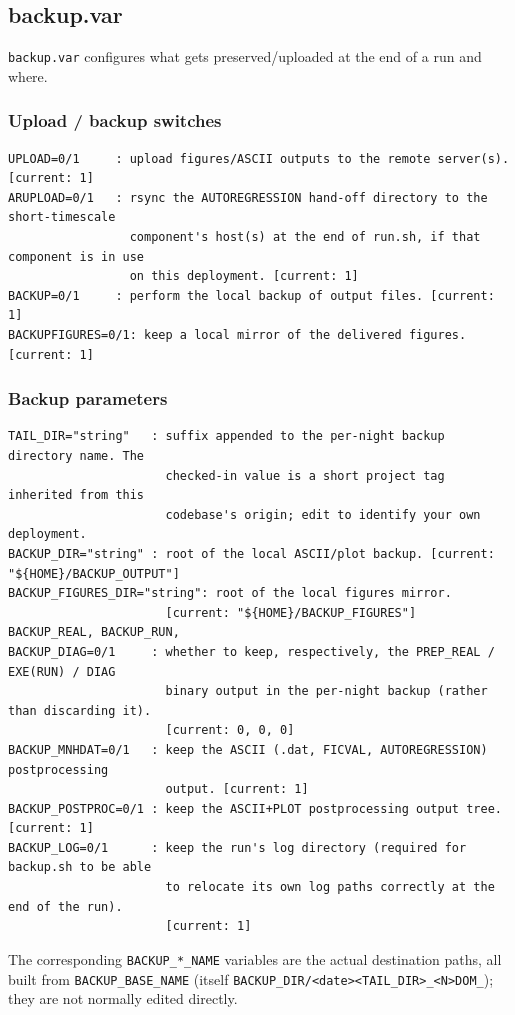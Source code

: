 \subsection{backup.var}
\texttt{backup.var} configures what gets preserved/uploaded at the end of a run and where.

\subsubsection{Upload / backup switches}
\begin{lstlisting}
UPLOAD=0/1     : upload figures/ASCII outputs to the remote server(s). [current: 1]
ARUPLOAD=0/1   : rsync the AUTOREGRESSION hand-off directory to the short-timescale
                 component's host(s) at the end of run.sh, if that component is in use
                 on this deployment. [current: 1]
BACKUP=0/1     : perform the local backup of output files. [current: 1]
BACKUPFIGURES=0/1: keep a local mirror of the delivered figures. [current: 1]
\end{lstlisting}

\subsubsection{Backup parameters}
\begin{lstlisting}
TAIL_DIR="string"   : suffix appended to the per-night backup directory name. The
                      checked-in value is a short project tag inherited from this
                      codebase's origin; edit to identify your own deployment.
BACKUP_DIR="string" : root of the local ASCII/plot backup. [current: "${HOME}/BACKUP_OUTPUT"]
BACKUP_FIGURES_DIR="string": root of the local figures mirror.
                      [current: "${HOME}/BACKUP_FIGURES"]
BACKUP_REAL, BACKUP_RUN,
BACKUP_DIAG=0/1     : whether to keep, respectively, the PREP_REAL / EXE(RUN) / DIAG
                      binary output in the per-night backup (rather than discarding it).
                      [current: 0, 0, 0]
BACKUP_MNHDAT=0/1   : keep the ASCII (.dat, FICVAL, AUTOREGRESSION) postprocessing
                      output. [current: 1]
BACKUP_POSTPROC=0/1 : keep the ASCII+PLOT postprocessing output tree. [current: 1]
BACKUP_LOG=0/1      : keep the run's log directory (required for backup.sh to be able
                      to relocate its own log paths correctly at the end of the run).
                      [current: 1]
\end{lstlisting}
The corresponding \texttt{BACKUP\_*\_NAME} variables are the actual destination paths, all built from
\texttt{BACKUP\_BASE\_NAME} (itself \texttt{BACKUP\_DIR/<date><TAIL\_DIR>\_<N>DOM\_<MESONH version>});
they are not normally edited directly.

